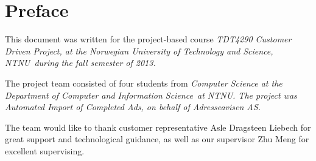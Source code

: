 \chapter*{Preface}
This document was written for the project-based course \em TDT4290 Customer Driven Project\em, at the \em Norwegian University of Technology and Science, NTNU\em \ during the fall semester of 2013.

The project team consisted of four students from \em Computer Science \em  at the \em Department of Computer and Information Science\em \ at \em NTNU\em. The project was \em Automated Import of Completed Ads\em, on behalf of \em Adresseavisen AS\em.

The team would like to thank customer representative Asle Dragsteen Liebech for great support and technological guidance, as well as our supervisor Zhu Meng for excellent supervising.